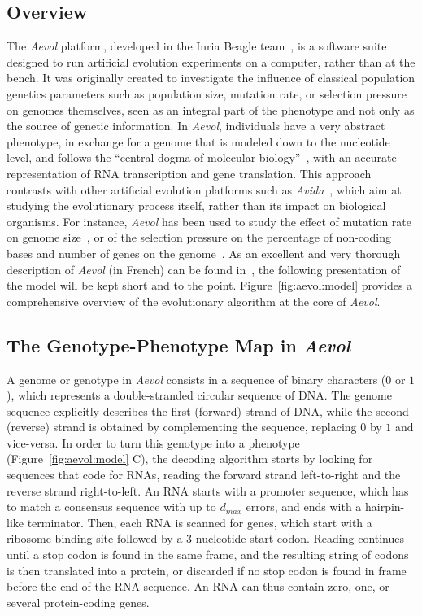 \subsection{Overview}

The \emph{Aevol} platform, developed in the Inria Beagle team~\citep{rutten2019}, is a software suite designed to run artificial evolution experiments on a computer, rather than at the bench.
It was originally created to investigate the influence of classical population genetics parameters such as population size, mutation rate, or selection pressure on genomes themselves, seen as an integral part of the phenotype and not only as the source of genetic information.
In \emph{Aevol}, individuals have a very abstract phenotype, in exchange for a genome that is modeled down to the nucleotide level, and follows the ``central dogma of molecular biology''~\citep{crick1958}, with an accurate representation of RNA transcription and gene translation.
This approach contrasts with other artificial evolution platforms such as \emph{Avida}~\citep{adami1994,ofria2004}, which aim at studying the evolutionary process itself, rather than its impact on biological organisms.
For instance, \emph{Aevol} has been used to study the effect of mutation rate on genome size~\citep{knibbe2005}, or of the selection pressure on the percentage of non-coding bases and number of genes on the genome~\citep{batut2013}.
As an excellent and very thorough description of \emph{Aevol} (in French) can be found in~\cite{liard2020}, the following presentation of the model will be kept short and to the point.
Figure~\ref{fig:aevol:model} provides a comprehensive overview of the evolutionary algorithm at the core of \emph{Aevol}.

\subsection{The Genotype-Phenotype Map in \emph{Aevol}}

A genome or genotype in \emph{Aevol} consists in a sequence of binary characters ($0$ or $1$), which represents a double-stranded circular sequence of DNA.
The genome sequence explicitly describes the first (forward) strand of DNA, while the second (reverse) strand is obtained by complementing the sequence, replacing $0$ by $1$ and vice-versa.
In order to turn this genotype into a phenotype (Figure~\ref{fig:aevol:model} C), the decoding algorithm starts by looking for sequences that code for RNAs, reading the forward strand left-to-right and the reverse strand right-to-left.
An RNA starts with a promoter sequence, which has to match a consensus sequence with up to $d_{max}$ errors, and ends with a hairpin-like terminator.
Then, each RNA is scanned for genes, which start with a ribosome binding site followed by a 3-nucleotide start codon.
Reading continues until a stop codon is found in the same frame, and the resulting string of codons is then translated into a protein, or discarded if no stop codon is found in frame before the end of the RNA sequence.
An RNA can thus contain zero, one, or several protein-coding genes.

